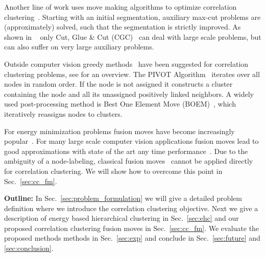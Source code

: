 Another line of work uses move making algorithms 
to optimize correlation clustering~\cite{bagon_2011_arxiv,beier_2014_cvpr,Kernighan-1970}.
Starting with an initial segmentation, auxiliary max-cut problems are (approximately) solved,
such that the segmentation is strictly improved.
As shown in ~\cite{beier_2014_cvpr} only Cut, Glue \& Cut (CGC)~\cite{beier_2014_cvpr} 
can deal with large scale problems, but can also suffer on very large auxiliary problems.

Outside computer vision greedy methods~\cite{Soon-2001,Ng-2002,Gionis-2007,Elsner-2008,Ailon-2008} have been suggested for correlation clustering problems, see \cite{Elsner-2009} for an overview.
The PIVOT Algorithm~\cite{Ailon-2008} iterates over all nodes in random order.
If the node is not assigned it constructs a cluster containing the node and all its 
unassigned positively linked neighbors.  
%
A widely used post-processing method is  Best One Element Move (BOEM)~\cite{Gionis-2007}, which iteratively reassigns nodes to clusters.

For energy minimization problems fusion moves have become increasingly popular~\cite{Lempitsky-2010,kappes_2014_ws}.
For many large scale computer vision applications fusion moves lead to good approximations
with state of the art any time performance~\cite{kappes_2014_ws}.
Due to the ambiguity of a node-labeling, classical fusion moves~\cite{Lempitsky-2010} cannot be applied directly for correlation clustering.
We will show how to overcome this point in Sec.~\ref{sec:cc_fm}.


\vspace{0.1cm}
\noindent \textbf{Outline:} 
In Sec.~\ref{sec:problem_formulation} we will give a 
detailed problem definition where we introduce 
the correlation clustering objective.
Next we give a description of energy based hierarchical clustering in Sec.~\ref{sec:ehc} and
our proposed correlation clustering fusion moves in Sec.~\ref{sec:cc_fm}.
We evaluate the proposed methods methods in Sec.~\ref{sec:exp} and conclude in Sec.~\ref{sec:future} and \ref{sec:conclusion}.



